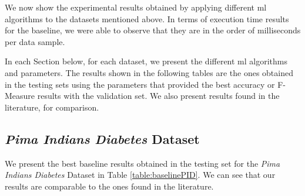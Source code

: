 We now show the experimental results obtained by applying different \ac{ml} algorithms to the datasets mentioned above.
In terms of execution time results for the baseline, we were able to observe that they are in the order of milliseconds per data sample.

In each Section below, for each dataset, we present the different \ac{ml} algorithms and parameters. The results shown in the following tables are the ones obtained in the testing sets using the parameters that provided the best accuracy or F-Measure results with the validation set. We also present results found in the literature, for comparison.

\subsection{\emph{Pima Indians Diabetes} Dataset}

We present the best baseline results obtained in the testing set for the \emph{Pima Indians Diabetes} Dataset in Table \ref{table:baselinePID}. We can see that our results are comparable to the ones found in the literature.

